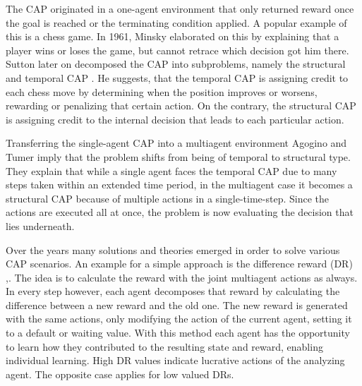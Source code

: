 The CAP originated in a one-agent environment that only returned reward once the goal is reached or the terminating condition applied. A popular example of this is a chess game. In 1961, Minsky \cite{mi61} elaborated on this by explaining that a player wins or loses the game, but cannot retrace which decision got him there. Sutton later on decomposed the CAP into subproblems, namely the structural and temporal CAP \cite{su84}. He suggests, that the temporal CAP is assigning credit to each chess move by determining when the position improves or worsens, rewarding or penalizing that certain action. On the contrary, the structural CAP is assigning credit to the internal decision that leads to each particular action.

Transferring the single-agent CAP into a multiagent environment Agogino and Tumer \cite{agtu04} imply that the problem shifts from being of temporal to structural type. They explain that while a single agent faces the temporal CAP due to many steps taken within an extended time period, in the multiagent case it becomes a structural CAP because of multiple actions in a single-time-step. Since the actions are executed all at once, the problem is now evaluating the decision that lies underneath.

Over the years many solutions and theories emerged in order to solve various CAP scenarios. An example for a simple approach is the difference reward (DR) \cite{agtu04},\cite{ngku18}. The idea is to calculate the reward with the joint multiagent actions as always. In every step however, each agent decomposes that reward by calculating the difference between a new reward and the old one. The new reward is generated with the same actions, only modifying the action of the current agent, setting it to a default or waiting value. With this method each agent has the opportunity to learn how they contributed to the resulting state and reward, enabling individual learning. High DR values indicate lucrative actions of the analyzing agent. The opposite case applies for low valued DRs.


